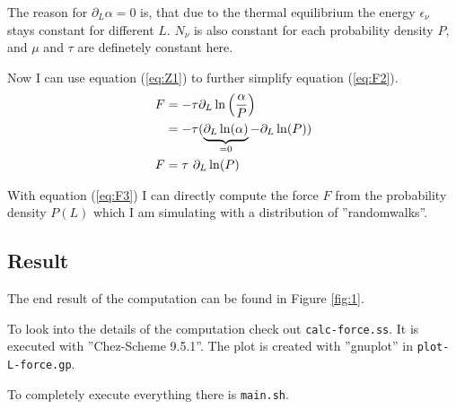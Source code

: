 \documentclass[a4paper,12pt]{scrartcl}
\begin{document}
The reason for $\partial_L \alpha = 0$ is, that due to the thermal equilibrium the energy $\epsilon_\nu$ stays constant for different $L$. $N_\nu$ is also constant for each probability density $P$, and $\mu$ and $\tau$ are definetely constant here.

Now I can use equation (\ref{eq:Z1}) to further simplify equation (\ref{eq:F2}).
\begin{align}
	F &= - \tau \partial_L \ln \left( \frac{\alpha}{P} \right) \notag \\
	&= - \tau ( \underbrace{\partial_L \ln(\alpha)}_{= 0} - \partial_L \ln(P) ) \notag \\
	F &= \tau \text{ } \partial_L \ln(P) \label{eq:F3}
\end{align}

With equation (\ref{eq:F3}) I can directly compute the force $F$ from the probability density $P(L)$ which I am simulating with a distribution of ''randomwalks''.

\subsection{Result}
The end result of the computation can be found in Figure \ref{fig:1}.


To look into the details of the computation check out \texttt{calc-force.ss}. It is executed with ''Chez-Scheme 9.5.1''.
The plot is created with ''gnuplot'' in \texttt{plot-L-force.gp}.

To completely execute everything there is \texttt{main.sh}.
\end{document}
